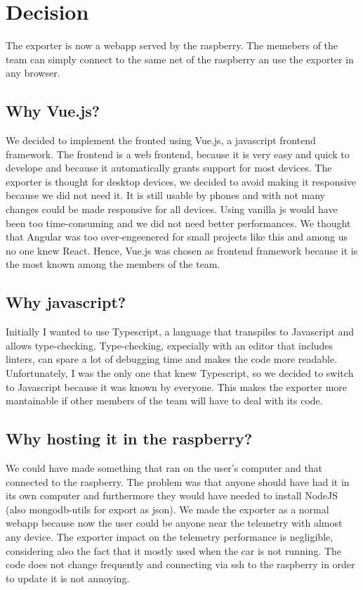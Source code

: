 \section{\huge{Decision}}
The exporter is now a webapp served by the raspberry. 
The memebers of the team can simply connect to the same net of the raspberry an use the exporter in any browser.

\subsection{Why Vue.js?}
We decided to implement the fronted using Vue.js, a javascript frontend framework. 
The frontend is a web frontend, because it is very easy and quick to develope and 
because it automatically grants support for most devices. 
The exporter is thought for desktop devices, we decided to avoid making it responsive because we did not need it. 
It is still usable by phones and with not many changes could be made responsive for all devices.  
Using vanilla js would have been too time-consuming and we did not need better performances. 
We thought that Angular was too over-engeenered for small projects like this and among us no one knew React.
Hence, Vue.js was chosen as frontend framework because it is the most known among the members of the team.

\subsection{Why javascript?}
Initially I wanted to use Typescript, a language that transpiles to Javascript and allows type-checking.
Type-checking, expecially with an editor that includes linters, can spare a lot of debugging time and makes 
the code more readable.
Unfortunately, I was the only one that knew Typescript, so we decided to switch to Javascript because it was known by everyone.
This makes the exporter more mantainable if other members of the team will have to deal with its code.

\subsection{Why hosting it in the raspberry?}
We could have made something that ran on the user's computer and that connected to the raspberry. 
The problem was that anyone should have had it in its own computer and furthermore they would have needed to 
install NodeJS (also mongodb-utils for export as json).
We made the exporter as a normal webapp because now the user could be anyone near the telemetry with almost any device.
The exporter impact on the telemetry performance is negligible, considering also the fact that it mostly used when 
the car is not running.
The code does not change frequently and connecting via ssh to the raspberry in order to update it is not annoying.

